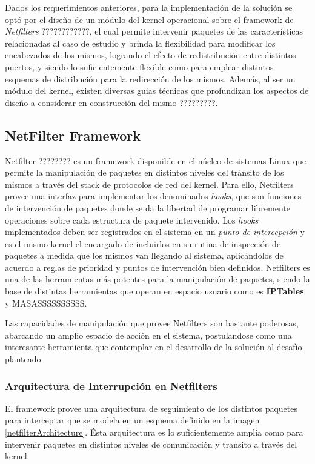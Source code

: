 Dados los requerimientos anteriores, para la implementación de la solución se optó por el diseño de un módulo del kernel operacional sobre el framework de \emph{Netfilters} ????????????, el cual permite intervenir paquetes de las características relacionadas al caso de estudio y brinda la flexibilidad para modificar los encabezados de los mismos, logrando el efecto de redistribución entre distintos puertos, y siendo lo suficientemente flexible como para emplear distintos esquemas de distribución para la redirección de los mismos. Además, al ser un módulo del kernel, existen diversas guias técnicas que profundizan los aspectos de diseño a considerar en construcción del mismo ?????????.

\subsection{NetFilter Framework}
Netfilter ???????? es un framework disponible en el núcleo de sistemas Linux que permite la manipulación de paquetes en distintos niveles del tránsito de los mismos a través del stack de protocolos de red del kernel. Para ello, Netfilters provee una interfaz para implementar los denominados \emph{hooks}, que son funciones de intervención de paquetes donde se da la libertad de programar libremente operaciones sobre cada estructura de paquete intervenido. Los \emph{hooks} implementados deben ser registrados en el sistema en un \emph{punto de intercepción} y es el mismo kernel el encargado de incluirlos en su rutina de inspección de paquetes a medida que los mismos van llegando al sistema, aplicándolos de acuerdo a reglas de prioridad y puntos de intervención bien definidos. Netfilters es una de las herramientas más potentes para la manipulación de paquetes, siendo la base de distintas herramientas que operan en espacio usuario como es \textbf{IPTables} y MASASSSSSSSSSS.

Las capacidades de manipulación que provee Netfilters son bastante poderosas, abarcando un amplio espacio de acción en el sistema, postulandose como una interesante herramienta que contemplar en el desarrollo de la solución al desafío planteado.

\subsubsection{Arquitectura de Interrupción en Netfilters}
El framework provee una arquitectura de seguimiento de los distintos paquetes para interceptar que se modela en un esquema definido en la imagen \ref{netfilterArchitecture}. Ésta arquitectura es lo suficientemente amplia como para intervenir paquetes en distintos niveles de comunicación y transito a través del kernel.

